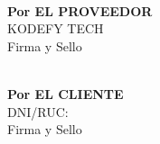 \documentclass[10pt,a4paper]{article}
\begin{document}
\vspace{1.2cm}

\noindent
\begin{minipage}{0.45\textwidth}
    \centering
    \hrulefill \\
    \textbf{Por EL PROVEEDOR} \\
    KODEFY TECH \\
    Firma y Sello
\end{minipage}
\hfill
\begin{minipage}{0.45\textwidth}
    \centering
    \hrulefill \\
    \textbf{Por EL CLIENTE} \\
    DNI/RUC: \hrulefill \\
    Firma y Sello
\end{minipage}
\end{document}
